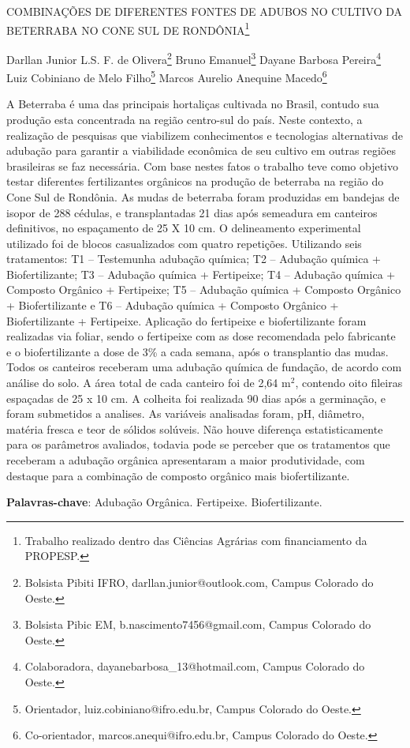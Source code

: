 \documentclass[article,12pt,onesidea,4paper,english,brazil]{abntex2}
\begin{document}
	
	
	\frenchspacing 
	
	\begin{center}
		\LARGE COMBINAÇÕES DE DIFERENTES FONTES DE ADUBOS NO CULTIVO DA
		BETERRABA NO CONE SUL DE RONDÔNIA\footnote{Trabalho realizado dentro das Ciências Agrárias com financiamento da PROPESP.}
		
		\normalsize
		Darllan Junior L.S. F. de Olivera\footnote{Bolsista Pibiti IFRO, darllan.junior@outlook.com, Campus Colorado do Oeste.} 
		Bruno Emanuel\footnote{Bolsista Pibic EM, b.nascimento7456@gmail.com, Campus Colorado do Oeste.} 
		Dayane Barbosa Pereira\footnote{Colaboradora, dayanebarbosa\_13@hotmail.com, Campus Colorado do Oeste.} 
		Luiz Cobiniano de Melo Filho\footnote{Orientador, luiz.cobiniano@ifro.edu.br, Campus Colorado do Oeste.}
		Marcos Aurelio Anequine Macedo\footnote{Co-orientador, marcos.anequi@ifro.edu.br, Campus Colorado do Oeste.} 
	\end{center}
	
	\noindent A Beterraba é uma das principais hortaliças cultivada no Brasil, contudo sua
	produção esta concentrada na região centro-sul do país. Neste contexto, a
	realização de pesquisas que viabilizem conhecimentos e tecnologias alternativas de
	adubação para garantir a viabilidade econômica de seu cultivo em outras regiões
	brasileiras se faz necessária. Com base nestes fatos o trabalho teve como objetivo
	testar diferentes fertilizantes orgânicos na produção de beterraba na região do Cone
	Sul de Rondônia. As mudas de beterraba foram produzidas em bandejas de isopor
	de 288 cédulas, e transplantadas 21 dias após semeadura em canteiros definitivos,
	no espaçamento de 25 X 10 cm. O delineamento experimental utilizado foi de blocos
	casualizados com quatro repetições. Utilizando seis tratamentos: T1 – Testemunha
	adubação química; T2 – Adubação química + Biofertilizante; T3 – Adubação química
	+ Fertipeixe; T4 – Adubação química + Composto Orgânico + Fertipeixe; T5 –
	Adubação química + Composto Orgânico + Biofertilizante e T6 – Adubação química +
	Composto Orgânico + Biofertilizante + Fertipeixe. Aplicação do fertipeixe e
	biofertilizante foram realizadas via foliar, sendo o fertipeixe com as dose
	recomendada pelo fabricante e o biofertilizante a dose de 3\% a cada semana, após
	o transplantio das mudas. Todos os canteiros receberam uma adubação química de
	fundação, de acordo com análise do solo. A área total de cada canteiro foi de 2,64
	m$^2$, contendo oito fileiras espaçadas de 25 x 10 cm. A colheita foi realizada 90 dias
	após a germinação, e foram submetidos a analises. As variáveis analisadas foram,
	pH, diâmetro, matéria fresca e teor de sólidos solúveis. Não houve diferença
	estatisticamente para os parâmetros avaliados, todavia pode se perceber que os
	tratamentos que receberam a adubação orgânica apresentaram a maior
	produtividade, com destaque para a combinação de composto orgânico mais
	biofertilizante.
	
	\vspace{\onelineskip}
	
	\noindent
	\textbf{Palavras-chave}: Adubação Orgânica. Fertipeixe. Biofertilizante.
	
\end{document}
